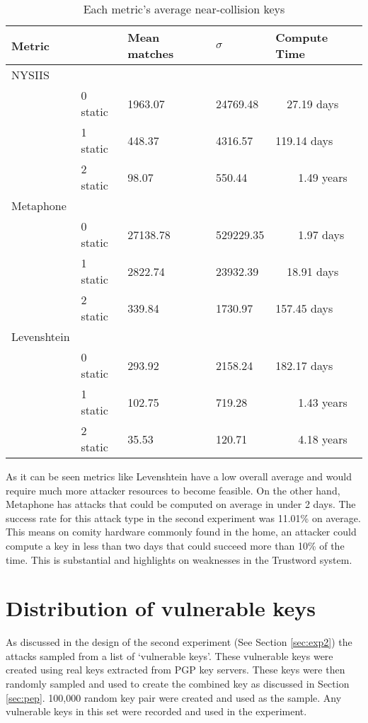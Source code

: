\begin{table}[!h]
    \centering
    \begin{tabular}{|lllll|}
        \hline
        \textbf{Metric} & & \textbf{Mean matches} & \textbf{$\sigma$} & \textbf{Compute Time} \\
        \hline
        NYSIIS &&&& \\
        \hline
        & 0 static & 1963.07 & 24769.48 & ~~27.19 days \\
        & 1 static & 448.37 & 4316.57 & 119.14 days \\
        & 2 static & 98.07 & 550.44 & ~~~~1.49 years \\
        \hline

        Metaphone &&&& \\
        \hline
        & 0 static & 27138.78 & 529229.35 & ~~~~1.97 days \\
        & 1 static & 2822.74 & 23932.39 & ~~18.91 days \\
        & 2 static & 339.84 & 1730.97 & 157.45 days \\
        \hline

        Levenshtein &&&& \\
        \hline
        & 0 static & 293.92 & 2158.24 & 182.17 days \\
        & 1 static & 102.75 & 719.28 & ~~~~1.43 years \\
        & 2 static & 35.53 & 120.71 & ~~~~4.18 years \\
        \hline

    \end{tabular}
    \caption{Each metric's average near-collision keys}
    \label{tab:average_perm}
\end{table}

As it can be seen metrics like Levenshtein have a low overall average and would require much more attacker resources to become feasible. On the other hand, Metaphone has attacks that could be computed on average in under 2 days. The success rate for this attack type in the second experiment was 11.01\% on average. This means on comity hardware commonly found in the home, an attacker could compute a key in less than two days that could succeed more than 10\% of the time. This is substantial and highlights on weaknesses in the Trustword system.

\section{Distribution of vulnerable keys}
As discussed in the design of the second experiment (See Section \ref{sec:exp2}) the attacks sampled from a list of `vulnerable keys'. These vulnerable keys were created using real keys extracted from PGP key servers. These keys were then randomly sampled and used to create the combined key as discussed in Section \ref{sec:pep}. 100,000 random key pair were created and used as the sample. Any vulnerable keys in this set were recorded and used in the experiment.

